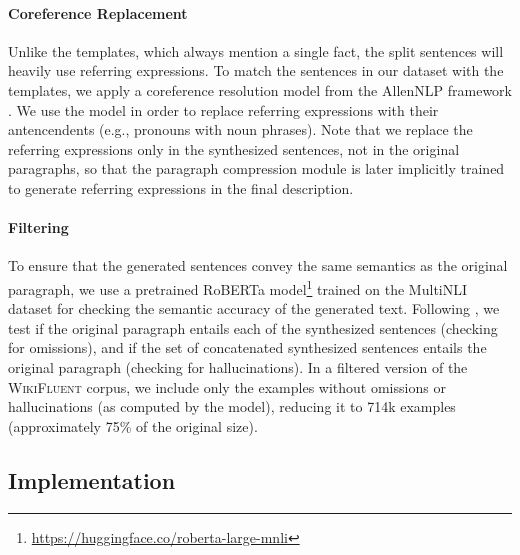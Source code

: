 


\paragraph{Coreference Replacement} Unlike the templates, which always mention a single fact, the split sentences will heavily use referring expressions. To match the sentences in our dataset with the templates, we apply a coreference resolution model \cite{Lee2018HigherorderCR} from the AllenNLP framework \cite{gardner2018allennlp}. We use the model in order to replace referring expressions with their antencendents (e.g., pronouns with noun phrases). Note that we replace the referring expressions only in the synthesized sentences, not in the original paragraphs, so that the paragraph compression module is later implicitly trained to generate referring expressions in the final description.

\paragraph{Filtering} To ensure that the generated sentences convey the same semantics as the original paragraph, we use a pretrained RoBERTa model\footnote{\url{https://huggingface.co/roberta-large-mnli}} \cite{liuRoBERTaRobustlyOptimized2019} trained on the MultiNLI dataset \cite{williams2018mnli} for checking the semantic accuracy of the generated text. Following \citet{dusekEvaluatingSemanticAccuracy2020}, we test if the original paragraph entails each of the synthesized sentences (checking for omissions), and if the set of concatenated synthesized sentences entails the original paragraph (checking for hallucinations). In a filtered version of the \textsc{WikiFluent} corpus, we include only the examples without omissions or hallucinations (as computed by the model), reducing it to 714k examples (approximately 75\% of the original size).

\subsection{Implementation}
\label{sec:pipeline:implementation}

